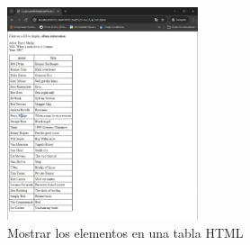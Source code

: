 \begin{figure}[H]
  \centering
  \includegraphics[width=0.5\textwidth]{img/ex12.jpg}
  \caption{Mostrar los elementos en una tabla HTML}
  \end{figure}